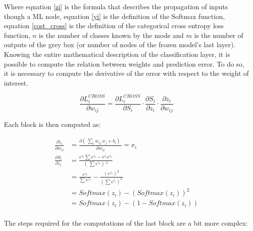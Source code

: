 \documentclass[12pt]{report}
\begin{document}
Where equation \ref{zi} is the formula that describes the propagation of inputs though a ML node, equation \ref{yi} is the definition of the Softmax function, equation \ref{cost_cross} is the definition of the categorical cross entropy loss function, $n$ is the number of classes known by the mode and $m$ is the number of outputs of the grey box (or number of nodes of the frozen model's last layer).\\
Knowing the entire mathematical description of the classification layer, it is possible to compute the relation between weights and prediction error. To do so, it is necessary to compute the derivative of the error with respect to the weight of interest. 

\begin{equation}
	\frac{\partial L^{CROSS}_i}{\partial w_{ij}} = \frac{\partial L^{CROSS}_i}{\partial S_i} \cdot \frac{\partial S_i}{\partial z_i} \cdot \frac{\partial z_i}{\partial w_{ij}}  
\end{equation}

Each block is then computed as:

\begin{align}
	\frac{\partial z_i}{\partial w_{ij}} &= \frac{ \partial (\ \sum_i w_{ij} \: x_j + b_i )\ }{ \partial w_{ij}} = x_i \\[10pt]
	\frac{\partial S_i}{\partial z_i} &= \frac{e^{z_i} \sum e^{z_i} - e^{z_i} e^{z_i}}{ (\ \sum e^{z_i} )\ ^2} \nonumber \\
	&= \frac{e^{z_i}}{\sum e^{z_i}}- \frac{(e^{z_i})^2}{(\sum e^{z_i})^2} \nonumber \\
	&= Softmax(z_i) - (Softmax(z_i))^2 \nonumber \\
	&= Softmax(z_i) - (1-Softmax(z_i)) \\[10pt]
\end{align}

The steps required for the computations of the last block are a bit more complex:

	
\end{document}
